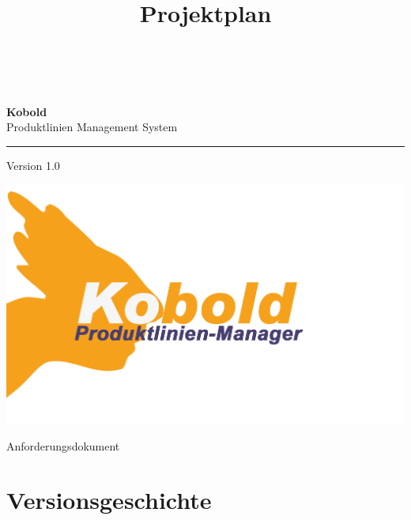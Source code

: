 \documentclass[a4paper,titlepage,12pt,ngerman]{scrbook}
\title {\huge \product\\[0.5cm]\large Projektplan \\[0.5cm] \version
  \\[1cm] \Large \company}
\newcommand\version{Version 1.0\xspace}
\begin{document}

\begin{titlepage}
\renewcommand{\thefootnote}{\fnsymbol{footnote}}
{\Huge
\raggedright
\textbf{\bf Kobold} \\
\huge Produktlinien Management System
\rule{\textwidth}{0.75pt}
\par
}
\begin{flushleft}
\normalsize
\version
\end{flushleft}

\vspace*{3cm}
\begin{center}
\includegraphics[width=15cm]{../common/logo-color.png}
\end{center}
\vfill

{\parindent=0cm
\Huge Anforderungsdokument
}


\setcounter{footnote}{0}
\end{titlepage}


\section*{Versionsgeschichte}



\tableofcontents




%
\end{document}
